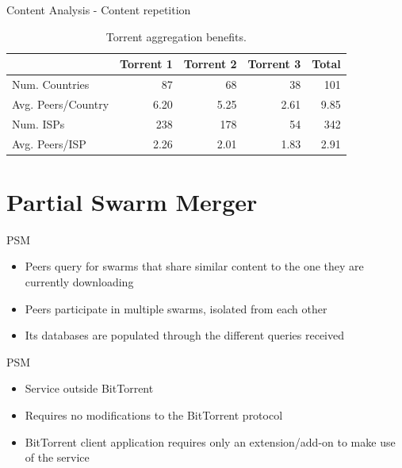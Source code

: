 \documentclass{beamer}
\begin{document}
\begin{frame}{Content Analysis - Content repetition}

\begin{table}
\renewcommand{\arraystretch}{1.1}
\label{table:aggregation_benefits}
\begin{center}
\begin{tabular}{l||r|r|r|r}
\hline
 & Torrent 1 & Torrent 2 & Torrent 3 & Total \\
\hline \hline
Num. Countries & 87 & 68 & 38 & 101 \\
Avg. Peers/Country & 6.20 & 5.25 & 2.61 & 9.85 \\
Num. ISPs & 238 & 178 & 54 & 342 \\
Avg. Peers/ISP & 2.26 & 2.01 & 1.83 & 2.91 \\
\hline
\end{tabular}
\end{center}
\caption{Torrent aggregation benefits.}
\end{table}

\end{frame}

\section{Partial Swarm Merger}

\begin{frame}{PSM}

\begin{itemize}
\addtolength{\itemsep}{1\baselineskip}
\item
    Peers query for swarms that share similar content to the one they are currently downloading
\item
   Peers participate in multiple swarms, isolated from each other
\item
   Its databases are populated through the different queries received
\end{itemize}
\end{frame}


\begin{frame}{PSM}

\begin{itemize}
\addtolength{\itemsep}{1\baselineskip}
\item
    Service outside BitTorrent
\item
    Requires no modifications to the BitTorrent protocol
\item
   BitTorrent client application requires only an extension/add-on to make use of the service
\end{itemize}

\end{frame}
\end{document}
